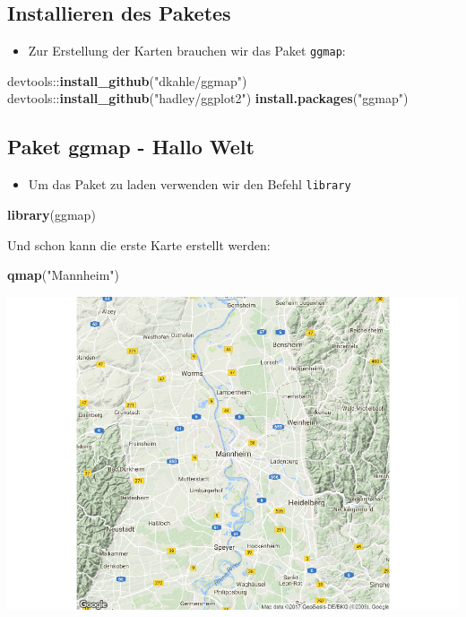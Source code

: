 \documentclass[]{article}
\newenvironment{Shaded}{\begin{snugshade}}{\end{snugshade}}
\newcommand{\KeywordTok}[1]{\textcolor[rgb]{0.13,0.29,0.53}{\textbf{{#1}}}}
\newcommand{\StringTok}[1]{\textcolor[rgb]{0.31,0.60,0.02}{{#1}}}
\newcommand{\NormalTok}[1]{{#1}}
\providecommand{\tightlist}{%
  \setlength{\itemsep}{0pt}\setlength{\parskip}{0pt}}
\begin{document}
\subsection{Installieren des Paketes}\label{installieren-des-paketes}

\begin{itemize}
\tightlist
\item
  Zur Erstellung der Karten brauchen wir das Paket \texttt{ggmap}:
\end{itemize}

\begin{Shaded}
\begin{Highlighting}[]
\NormalTok{devtools::}\KeywordTok{install_github}\NormalTok{(}\StringTok{"dkahle/ggmap"}\NormalTok{)}
\NormalTok{devtools::}\KeywordTok{install_github}\NormalTok{(}\StringTok{"hadley/ggplot2"}\NormalTok{)}
\KeywordTok{install.packages}\NormalTok{(}\StringTok{"ggmap"}\NormalTok{)}
\end{Highlighting}
\end{Shaded}

\subsection{Paket ggmap - Hallo Welt}\label{paket-ggmap---hallo-welt}

\begin{itemize}
\tightlist
\item
  Um das Paket zu laden verwenden wir den Befehl \texttt{library}
\end{itemize}

\begin{Shaded}
\begin{Highlighting}[]
\KeywordTok{library}\NormalTok{(ggmap)}
\end{Highlighting}
\end{Shaded}

Und schon kann die erste Karte erstellt werden:

\begin{Shaded}
\begin{Highlighting}[]
\KeywordTok{qmap}\NormalTok{(}\StringTok{"Mannheim"}\NormalTok{)}
\end{Highlighting}
\end{Shaded}

\includegraphics{Intro_Datenanalyse1_files/figure-latex/unnamed-chunk-237-1.pdf}
\end{document}
